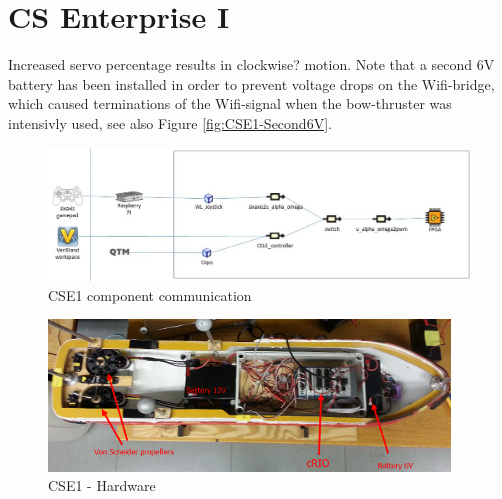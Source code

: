 \documentclass[a4paper,twoside,english]{report}
\begin{document}
\chapter{CS Enterprise I}

Increased servo percentage results in clockwise? motion. Note that
a second 6V battery has been installed in order to prevent voltage
drops on the Wifi-bridge, which caused terminations of the Wifi-signal
when the bow-thruster was intensivly used, see also Figure \ref{fig:CSE1-Second6V}.

\begin{figure}[!h]
\centering \includegraphics[scale=0.45]{fig/CSE1_control_software.jpg}
\caption{CSE1 component communication}

\label{fig: software module communication-1} 
\end{figure}

\begin{figure}[h!]
\centering \includegraphics[width=0.95\textwidth]{fig/innmat_CSE1} \caption{CSE1 - Hardware \label{fig: CSE1 hardware} }
\end{figure}
\end{document}
